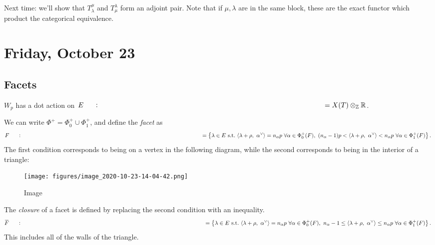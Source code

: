 Next time: we'll show that \(T_\lambda^\mu\) and \(T_\mu^\lambda\) form
an adjoint pair. Note that if \(\mu, \lambda\) are in the same block,
these are the exact functor which product the categorical equivalence.

\hypertarget{friday-october-23}{%
\section{Friday, October 23}\label{friday-october-23}}

\hypertarget{facets}{%
\subsection{Facets}\label{facets}}

\(W_p\) has a dot action on
\(E \mathrel{\vcenter{:}}= X(T) \otimes_{\mathbb{Z}}{\mathbb{R}}\).

\begin{definition}[Facet]

\begin{definition}[Facet]

We can write \(\Phi^+ = \Phi_0^+ \cup\Phi_1^+\), and define the
\emph{facet} as
\begin{align*}   F \mathrel{\vcenter{:}}=\left\{{ \lambda \in E ~{\text{s.t.}}~{\left\langle {\lambda + \rho},~{\alpha^\vee} \right\rangle} = n_\alpha p\,\, \forall\alpha\in \Phi_0^+(F),\,\, (n_\alpha - 1)p < {\left\langle {\lambda + \rho},~{\alpha^\vee} \right\rangle} < n_\alpha p \,\,\forall \alpha\in \Phi_1^+(F) }\right\} .\end{align*}
The first condition corresponds to being on a vertex in the following
diagram, while the second corresponds to being in the interior of a
triangle:

\begin{figure}
\centering
\texttt{[image: figures/image\_2020-10-23-14-04-42.png]}
\caption{Image}
\end{figure}

\end{definition}

\end{definition}

\begin{definition}

\begin{definition}

The \emph{closure} of a facet is defined by replacing the second
condition with an inequality.
\begin{align*}   \mkern 1.5mu\overline{\mkern-1.5muF\mkern-1.5mu}\mkern 1.5mu \mathrel{\vcenter{:}}=\left\{{ \lambda \in E ~{\text{s.t.}}~{\left\langle {\lambda + \rho},~{\alpha^\vee} \right\rangle} = n_\alpha p\,\,  \forall\alpha\in \Phi_0^+(F),\,\, n_\alpha - 1 \leq  {\left\langle {\lambda + \rho},~{\alpha^\vee} \right\rangle} \leq n_\alpha p  \,\,\forall \alpha\in \Phi_1^+(F) }\right\} .\end{align*}
This includes all of the walls of the triangle.

\end{definition}

\end{definition}

